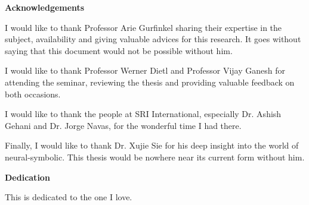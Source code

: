 \cleardoublepage


\begin{center}\textbf{Acknowledgements}\end{center}
I would like to thank Professor Arie Gurfinkel sharing their  expertise  in  the  subject,  availability  and  giving  valuable  advices  for  this  research. It goes without saying that this document would not be possible without him. 

I would like to thank Professor Werner Dietl and Professor Vijay Ganesh for attending the seminar, reviewing the thesis and providing valuable feedback on both occasions. 

I would like to thank the people at SRI International, especially Dr. Ashish Gehani and Dr. Jorge Navas, for the wonderful time I had there.

Finally, I would like to thank Dr. Xujie Sie for his deep insight into the world of neural-symbolic. This thesis would be nowhere near its current form without him.
\cleardoublepage


\begin{center}\textbf{Dedication}\end{center}

This is dedicated to the one I love.
\cleardoublepage

\renewcommand\contentsname{Table of Contents}
\tableofcontents
\cleardoublepage
{}    %

\listoftables
\cleardoublepage
{}		%

\listoffigures
\cleardoublepage
{}		%

\printglossaries
\cleardoublepage
{}		%


